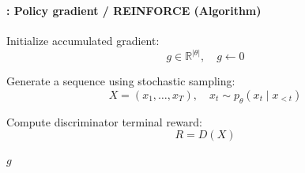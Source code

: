 \documentclass[xcolor=table]{beamer}
\begin{document}
	\begin{frame}[fragile]
		\frametitle{\insertshortsubtitle}
		\framesubtitle{\insertsection: Policy gradient / REINFORCE (Algorithm)}
		
		\scriptsize
		
		\begin{algorithm}[H]
			
			Initialize accumulated gradient:
			\[
			g \in \mathbb{R}^{|\theta|}, \quad g \leftarrow 0
			\]
			
			Generate a sequence using stochastic sampling:
			\[
			X=(x_1,\dots,x_T), \quad x_t \sim p_\theta(x_t \mid x_{<t})
			\]
			
			Compute discriminator terminal reward:
			\[
			R=D(X)
			\]
			
			
			\Return $g$
			
			\caption{REINFORCE update for sequence generation}
			
		\end{algorithm}
		
	\end{frame}
	
\end{document}
